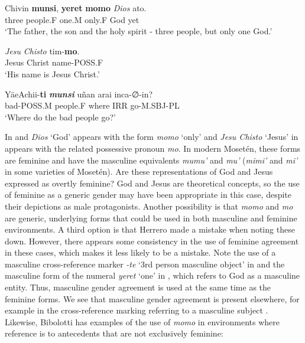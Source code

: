 \documentclass[output=paper,colorlinks,citecolor=brown
]{langscibook}
\begin{document}
     Chivin \textbf{munsi}, 		\textbf{yeret} 	\textbf{momo} 	\emph{Dios} 	ato.\\
    three	people.F	one.M	only.F	God	yet\\
\glt ‘The father, the son and the holy spirit - three people, but only one God.’
\z	

\ea \label{sakel_example_8}
\gll \emph{Jesu} \emph{Chisto} 	tim-\textbf{mo}.\\
     Jesus Christ	name-\textsc{POSS.F}\\
\glt ‘His name is Jesus Christ.’
\z

 \ea \label{sakel_example_9}
\gll YäeAchii-\textbf{ti} 	\textbf{\emph{munsi}} 		uñan 	arai 	inca-∅-in?\\
     bad-\textsc{POSS.M}	people.\textsc{F}	where	\textsc{IRR}	go-\textsc{M.SBJ-PL}\\
\glt ‘Where do the bad people go?’
\z

In  and  \textit{Dios} ‘God’ appears with the form \textit{momo} ‘only’ and \textit{Jesu Chisto} ‘Jesus’ in  appears with the related possessive pronoun \textit{mo}. In modern Mosetén, these forms are feminine and have the masculine equivalents \textit{mumu’} and \textit{mu’} (\textit{mimi’} and \textit{mi’} in some varieties of Mosetén). Are these representations of God and Jesus expressed as overtly feminine? God and Jesus are theoretical concepts, so the use of feminine as a generic gender may have been appropriate in this case, despite their depictions as male protagonists. Another possibility is that \textit{momo} and \textit{mo} are generic, underlying forms that could be used in both masculine and feminine environments. A third option is that Herrero made a mistake when noting these down. However, there appears some consistency in the use of feminine agreement in these cases, which makes it less likely to be a mistake. 
Note the use of a masculine cross-reference marker \textit{-te} ‘3rd person masculine object’ in  and the masculine form of the numeral \textit{yeret} ‘one’ in , which refers to God as a masculine entity. Thus, masculine gender agreement is used at the same time as the feminine forms. We see that masculine gender agreement is present elsewhere, for example in the cross-reference marking referring to a masculine subject . 
Likewise, Bibolotti has examples of the use of \textit{momo} in environments where reference is to antecedents that are not exclusively feminine: 
\end{document}
